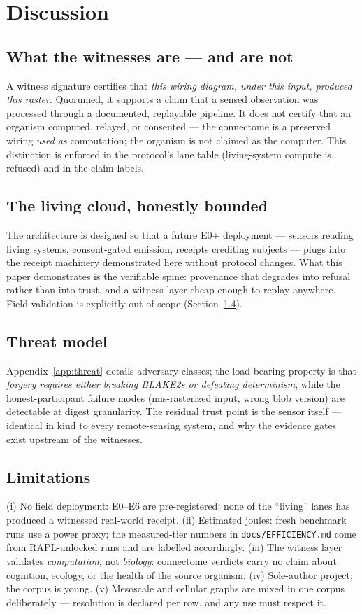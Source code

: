\documentclass[pdflatex,sn-basic]{sn-jnl}
\begin{document}
\section{Discussion}\label{sec:disc}
\subsection{What the witnesses are --- and are not}
A witness signature certifies that \emph{this wiring diagram, under
this input, produced this raster}. Quorumed, it supports a claim that
a sensed observation was processed through a documented, replayable
pipeline. It does not certify that an organism computed, relayed, or
consented --- the connectome is a preserved wiring \emph{used as}
computation; the organism is not claimed as the computer. This
distinction is enforced in the protocol's lane table (living-system
compute is refused) and in the claim labels.

\subsection{The living cloud, honestly bounded}
The architecture is designed so that a future E0+ deployment ---
sensors reading living systems, consent-gated emission, receipts
crediting subjects --- plugs into the receipt machinery demonstrated
here without protocol changes. What this paper demonstrates is the
verifiable spine: provenance that degrades into refusal rather than
into trust, and a witness layer cheap enough to replay anywhere.
Field validation is explicitly out of scope (Section~\ref{sec:lim}).

\subsection{Threat model}
Appendix~\ref{app:threat} details adversary classes; the load-bearing
property is that \emph{forgery requires either breaking BLAKE2s or
defeating determinism}, while the honest-participant failure modes
(mis-rasterized input, wrong blob version) are detectable at digest
granularity. The residual trust point is the sensor itself ---
identical in kind to every remote-sensing system, and why the
evidence gates exist upstream of the witnesses.

\subsection{Limitations}\label{sec:lim}
(i) No field deployment: E0--E6 are pre-registered; none of the
``living'' lanes has produced a witnessed real-world receipt.
(ii) Estimated joules: fresh benchmark runs use a power proxy; the
measured-tier numbers in \texttt{docs/EFFICIENCY.md} come from
RAPL-unlocked runs and are labelled accordingly.
(iii) The witness layer validates \emph{computation}, not
\emph{biology}: connectome verdicts carry no claim about cognition,
ecology, or the health of the source organism. (iv) Sole-author
project; the corpus is young. (v) Mesoscale and cellular graphs are
mixed in one corpus deliberately --- resolution is declared per row,
and any use must respect it.
\end{document}
